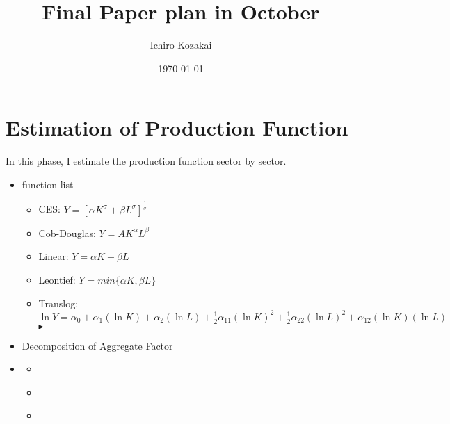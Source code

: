 \documentclass[dvipdfmx,uplatex]{jsarticle}
\title{Final Paper plan in October}
\author{Ichiro Kozakai}
\date{\today}
\begin{document}
\maketitle
\section{Estimation of Production Function}
In this phase, I estimate the production function sector by sector.
\begin{itemize}
    \setlength{\itemsep}{7.5mm}
    \item function list
          \begin{itemize}
              \item CES: \hspace{5mm} $Y=[{\alpha{K^{\sigma}}}+{\beta{L^{\sigma}}}]^{\frac{1}{\sigma}}$
              \item Cob-Douglas: \hspace{5mm} $Y=AK^{\alpha}L^{\beta}$
              \item Linear: \hspace{5mm} $Y={\alpha}K+{\beta}L$
              \item Leontief: \hspace{5mm} $Y=min\{{\alpha}K, {\beta}L\}$
              \item Translog:
                    {\hspace{5mm} {\small $\ln{Y}=\alpha_{0}+{\alpha_{1}{(\ln{K})}}+{\alpha_{2}{(\ln{L})}}+{\frac{1}{2}}{\alpha_{11}(\ln{K})^{2}}+{\frac{1}{2}}{\alpha_{22}(\ln{L})^{2}}+{\alpha_{12}{(\ln{K})}{(\ln{L})}}$}} \\
                    $\blacktriangleright$\href{https://www.rieti.go.jp/jp/publications/summary/17050024.html}{}
          \end{itemize}
    \item Decomposition of Aggregate Factor
    \item \href{https://management-accounting.biz/industry-type-2/}{}
          \begin{itemize}
              \item \href{https://www.jpx.co.jp/markets/indices/carbon-efficient/nlsgeu000003b0r8-att/sp-jpx-carbon-efficient-index-constituent-report.pdf}{}
              \item \href{https://www.nikkei.com/telecom/industry_l}{}
              \item \href{https://www.soumu.go.jp/toukei_toukatsu/index/seido/sangyo/02toukatsu01_03000044.html}{}

\end{itemize}
\end{itemize}
\end{document}
